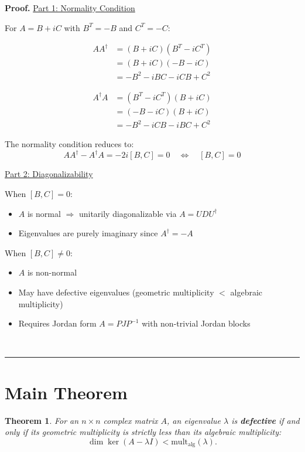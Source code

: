\documentclass[aps,preprint]{revtex4}
\newtheorem{theorem}{Theorem}
\newenvironment{proof}[1][Proof]{\noindent\textbf{#1.} }{\ \rule{0.5em}{0.5em}}
\begin{document}
\begin{proof}
\underline{Part 1: Normality Condition}

For $A = B + iC$ with $B^T = -B$ and $C^T = -C$:

\begin{align*}
AA^\dagger &= (B + iC)(B^T - iC^T) \\
&= (B + iC)(-B - iC) \\
&= -B^2 - iBC - iCB + C^2
\end{align*}

\begin{align*}
A^\dagger A &= (B^T - iC^T)(B + iC) \\
&= (-B - iC)(B + iC) \\
&= -B^2 - iCB - iBC + C^2
\end{align*}

The normality condition reduces to: 
\begin{equation}
AA^\dagger - A^\dagger A = -2i[B,C] = 0 \quad \iff \quad [B,C] = 0
\end{equation}

\underline{Part 2: Diagonalizability}

When $[B,C] = 0$:

\begin{itemize}
\item $A$ is normal $\Rightarrow$ unitarily diagonalizable via $A =
UDU^\dagger$

\item Eigenvalues are purely imaginary since $A^\dagger = -A$
\end{itemize}

When $[B,C] \neq 0$:

\begin{itemize}
\item $A$ is non-normal

\item May have defective eigenvalues (geometric multiplicity $<$ algebraic
multiplicity)

\item Requires Jordan form $A = PJP^{-1}$ with non-trivial Jordan blocks
\end{itemize}
\end{proof}

\section{Main Theorem}

\begin{theorem}
For an $n \times n$ complex matrix $A$, an eigenvalue $\lambda$ is \textbf{%
defective} if and only if its geometric multiplicity is strictly less than
its algebraic multiplicity: 
\begin{equation*}
\dim \ker(A - \lambda I) < \text{mult}_{\text{alg}}(\lambda).
\end{equation*}
\end{theorem}
\end{document}
